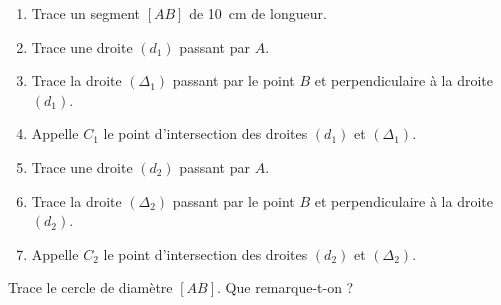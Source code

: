 \begin{myenumerate}
  \item
    \begin{enumerate}
    \item Trace un segment $[AB]$ de 10~cm de longueur.
    \item Trace une droite $(d_1)$ passant par $A$.
    \item Trace la droite $(\Delta_1)$ passant par le point $B$ et
      perpendiculaire à la droite $(d_1)$.
    \item Appelle $C_1$ le point d'intersection des droites $(d_1)$ et
      $(\Delta_1)$.
    \item Trace une droite $(d_2)$ passant par $A$.
    \item Trace la droite $(\Delta_2)$ passant par le point $B$ et
      perpendiculaire à la droite $(d_2)$.
    \item Appelle $C_2$ le point d'intersection des droites $(d_2)$ et
      $(\Delta_2)$.
    \end{enumerate}
  \item Trace le cercle de diamètre $[AB]$. Que remarque-t-on ?
\end{myenumerate}
